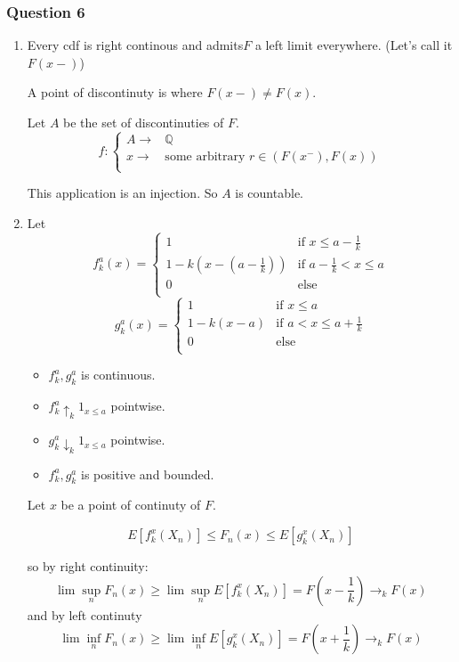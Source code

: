 \documentclass[12pt]{article}
\newcommand{\Q}[1]{\subsubsection*{Question #1}}
\begin{document}
\Q{6}
\begin{enumerate}

\item
Every cdf is right continous and admits$F$ a left limit everywhere. (Let's call it $F(x-)$)

A point of discontinuty is where $F(x-) \neq F(x)$.


Let $A$ be the set of discontinuties of $F$.
\[
f: \left\{ 
\begin{array}{ll}
      A \longrightarrow &\mathbb{Q}\\
      x \longrightarrow &\text{some arbitrary } r \in (F(x^-), F(x))\\
\end{array}
\right.
\]

This application is an injection. So $A$ is countable.

\item


Let 
\[ f_k^a(x) = 
\left
\{ \begin{array}{ll}
1 & \text{if $x \leq a-\frac1 k$}\\
1 - k(x-(a-\frac1 k))&\text{if $a-\frac1 k  < x \leq a$}\\
0&\text{else}\\
\end{array}\right. \]
\[ g_k^a(x) = 
\left
\{ \begin{array}{ll}
1 & \text{if $x \leq a$}\\
1 - k(x-a)&\text{if $a < x \leq a + \frac 1 k$}\\
0&\text{else}\\
\end{array}\right. \]


\begin{itemize}
\item $f_k^a, g_k^a$ is continuous.
\item $f_k^a \uparrow_k 1_{x \leq a}$ pointwise.
\item $g_k^a \downarrow_k 1_{x \leq a}$ pointwise.
\item $f_k^a, g_k^a$ is positive and bounded.
\end{itemize}

Let $x$ be a point of continuty of $F$.

$$E[f_k^x(X_n)] \leq F_n(x) \leq E[g_k^x(X_n)]$$


so by right continuity: $$\lim \sup_n F_n(x) \geq \lim\sup_nE[f_k^x(X_n)] = F(x-\frac 1 k) \rightarrow_k F(x)$$
and by left continuty $$\lim \inf_n F_n(x) \geq \lim\inf_nE[g_k^x(X_n)] = F(x+\frac 1 k) \rightarrow_k F(x)$$


\end{enumerate}
\end{document}
